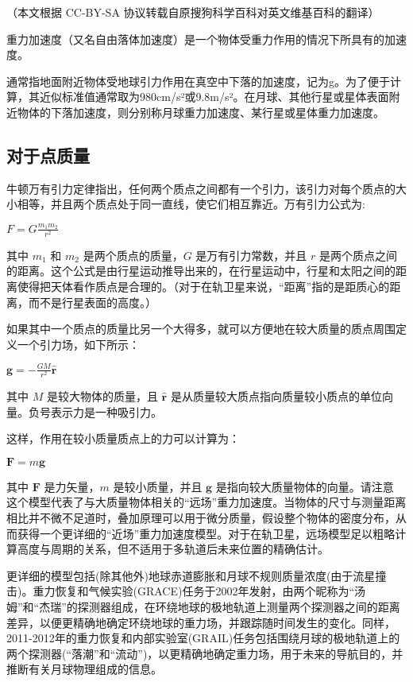
（本文根据 CC-BY-SA 协议转载自原搜狗科学百科对英文维基百科的翻译）


重力加速度（又名自由落体加速度）是一个物体受重力作用的情况下所具有的加速度。

通常指地面附近物体受地球引力作用在真空中下落的加速度，记为g。为了便于计算，其近似标准值通常取为980cm/s²或9.8m/s²。在月球、其他行星或星体表面附近物体的下落加速度，则分别称月球重力加速度、某行星或星体重力加速度。

\subsection{对于点质量}

牛顿万有引力定律指出，任何两个质点之间都有一个引力，该引力对每个质点的大小相等，并且两个质点处于同一直线，使它们相互靠近。万有引力公式为:

$F = G \frac{m_1 m_2}{r^2}$

其中 $m_1$ 和 $m_2$ 是两个质点的质量，$G$ 是万有引力常数，并且 $r$ 是两个质点之间的距离。这个公式是由行星运动推导出来的，在行星运动中，行星和太阳之间的距离使得把天体看作质点是合理的。（对于在轨卫星来说，“距离”指的是距质心的距离，而不是行星表面的高度。）

如果其中一个质点的质量比另一个大得多，就可以方便地在较大质量的质点周围定义一个引力场，如下所示：

$\mathbf{g} = -\frac{GM}{r^2} \hat{\mathbf{r}}$

其中 $M$ 是较大物体的质量，且 $\hat{\mathbf{r}}$ 是从质量较大质点指向质量较小质点的单位向量。负号表示力是一种吸引力。

这样，作用在较小质量质点上的力可以计算为：

$\mathbf{F} = m\mathbf{g}$

其中 $\mathbf{F}$ 是力矢量，$m$ 是较小质量，并且 $\mathbf{g}$ 是指向较大质量物体的向量。请注意    这个模型代表了与大质量物体相关的“远场”重力加速度。当物体的尺寸与测量距离相比并不微不足道时，叠加原理可以用于微分质量，假设整个物体的密度分布，从而获得一个更详细的“近场”重力加速度模型。对于在轨卫星，远场模型足以粗略计算高度与周期的关系，但不适用于多轨道后未来位置的精确估计。

更详细的模型包括(除其他外)地球赤道膨胀和月球不规则质量浓度(由于流星撞击)。重力恢复和气候实验(GRACE)任务于2002年发射，由两个昵称为“汤姆”和“杰瑞”的探测器组成，在环绕地球的极地轨道上测量两个探测器之间的距离差异，以便更精确地确定环绕地球的重力场，并跟踪随时间发生的变化。同样，2011-2012年的重力恢复和内部实验室(GRAIL)任务包括围绕月球的极地轨道上的两个探测器(“落潮”和“流动”)，以更精确地确定重力场，用于未来的导航目的，并推断有关月球物理组成的信息。

